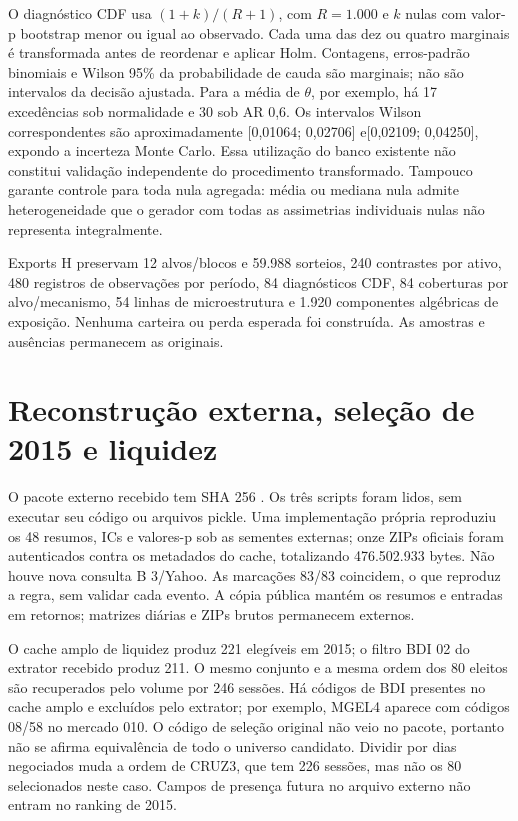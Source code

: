 \documentclass[12 pt]{article}
\begin{document}
O diagnóstico CDF usa $(1+k)/(R+1)$, com $R=1.000$ e $k $ nulas
com valor-p bootstrap menor ou igual ao observado. Cada uma das dez
ou quatro marginais é transformada antes de reordenar e aplicar Holm.
Contagens, erros-padrão binomiais e Wilson 95\% da probabilidade de cauda
são marginais; não são intervalos da decisão ajustada. Para a média
de $\theta $, por exemplo, há 17 excedências sob normalidade e 30
sob AR 0,6. Os intervalos Wilson correspondentes são aproximadamente
[0,01064; 0,02706] e[0,02109; 0,04250], expondo a incerteza Monte Carlo.
Essa utilização do banco existente não constitui validação independente
do procedimento transformado. Tampouco garante controle para toda nula
agregada: média ou mediana nula admite heterogeneidade que o gerador
com todas as assimetrias individuais nulas não representa integralmente.

\begin{table}[htbp]\centering\small
\caption{Diagnóstico exploratório CDF, seguido de Holm na família original
completa F 10 ou G 4. Faixas entre seis mecanismos, sem significado de IC.}

\end{table}
Exports H preservam 12 alvos/blocos e 59.988 sorteios, 240 contrastes por
ativo, 480 registros de observações por período, 84 diagnósticos CDF,
84 coberturas por alvo/mecanismo, 54 linhas de microestrutura e 1.920
componentes algébricas de exposição. Nenhuma carteira ou perda esperada
foi construída. As amostras e ausências permanecem as originais.

\section{Reconstrução externa, seleção de 2015 e liquidez}
O pacote externo recebido tem SHA 256
.
Os três scripts foram lidos, sem executar seu código ou arquivos pickle.
Uma implementação própria reproduziu os 48 resumos, ICs e valores-p
sob as sementes externas; onze ZIPs oficiais foram autenticados contra
os metadados do cache, totalizando 476.502.933 bytes. Não houve nova
consulta B 3/Yahoo. As marcações 83/83 coincidem, o que reproduz a regra,
sem validar cada evento. A cópia pública mantém os resumos e entradas
em retornos; matrizes diárias e ZIPs brutos permanecem externos.

O cache amplo de liquidez produz 221 elegíveis em 2015; o filtro
BDI 02 do extrator recebido produz 211. O mesmo conjunto e a mesma
ordem dos 80 eleitos são recuperados pelo volume por 246 sessões.
Há códigos de BDI presentes no cache amplo e excluídos pelo extrator;
por exemplo, MGEL4 aparece com códigos 08/58 no mercado 010.
O código de seleção original não veio no pacote, portanto não se
afirma equivalência de todo o universo candidato. Dividir por dias
negociados muda a ordem de CRUZ3, que tem 226 sessões, mas não os 80
selecionados neste caso. Campos de presença futura no arquivo externo
não entram no ranking de 2015.
\end{document}
